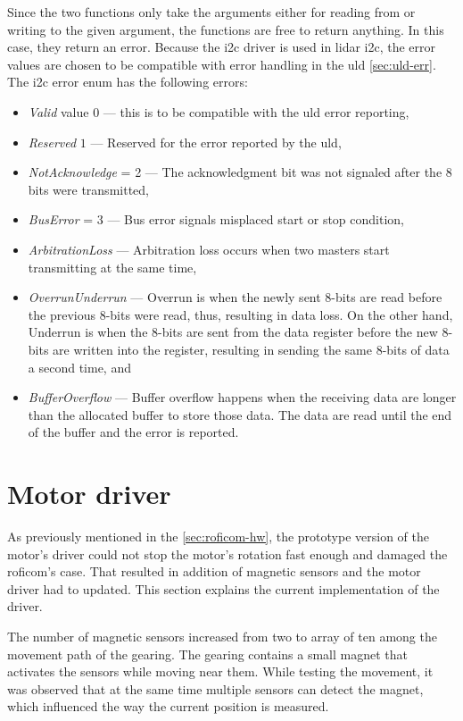 \documentclass[
  digital,     %
  oneside,     %
  nosansbold,  %
  nocolorbold, %
  nolof,         %
  nolot,         %
]{fithesis4}
\begin{document}
{{{Since the two functions only take the arguments either for reading from or writing to the given argument, the functions are free to return anything. In this case, they return an error. Because the \acrshort{i2c} driver is used in \acrshort{lidar} \acrshort{i2c}, the error values are chosen to be compatible with error handling in the \acrshort{uld} \autoref{sec:uld-err}. The \acrshort{i2c} error enum has the following errors:
\begin{itemize}
    \item \emph{Valid} value $0$ --- this is to be compatible with the \acrshort{uld} error reporting,
    \item \emph{Reserved} $1$ --- Reserved for the error reported by the \acrshort{uld},
    \item \emph{NotAcknowledge} = 2 --- The acknowledgment bit was not signaled after the 8 bits were transmitted,
    \item \emph{BusError} = 3 --- Bus error signals misplaced start or stop condition,
    \item \emph{ArbitrationLoss} --- Arbitration loss occurs when two masters start transmitting at the same time,
    \item \emph{OverrunUnderrun} --- Overrun is when the newly sent 8-bits are read before the previous 8-bits were read, thus, resulting in data loss. On the other hand, Underrun is when the 8-bits are sent from the data register before the new 8-bits are written into the register, resulting in sending the same 8-bits of data a second time, and
    \item \emph{BufferOverflow} --- Buffer overflow happens when the receiving data are longer than the allocated buffer to store those data. The data are read until the end of the buffer and the error is reported.
\end{itemize}

\section{ Motor driver }

As previously mentioned in the \autoref{sec:roficom-hw}, the prototype version of the motor's driver could not stop the motor's rotation fast enough and damaged the \acrshort{roficom}'s case. That resulted in addition of magnetic sensors and the motor driver had to updated. This section explains the current implementation of the driver.

The number of magnetic sensors increased from two to array of ten among the movement path of the gearing. The gearing contains a small magnet that activates the sensors while moving near them. While testing the movement, it was observed that at the same time multiple sensors can detect the magnet, which influenced the way the current position is measured.

}}}
\end{document}
